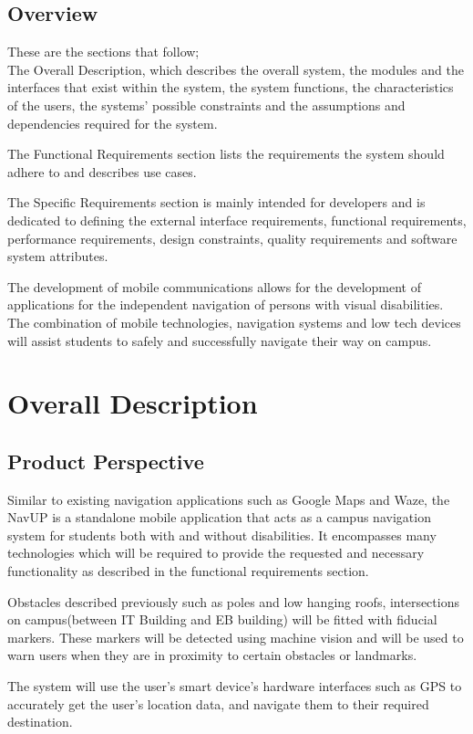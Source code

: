 \documentclass{article}
\begin{document}
	\subsection{Overview}
		These are the sections that follow; \\
		The Overall Description, which describes the overall system, the modules and the interfaces that exist within the system, the system functions, the characteristics of the users, the systems' possible constraints and the assumptions and dependencies required for the system.\par
		The Functional Requirements section lists the requirements the system should adhere to and describes use cases.\par
		The Specific Requirements section is mainly intended for developers and is dedicated to defining the external interface requirements, functional requirements, performance requirements, design constraints, quality requirements and software system attributes. \par
		The development of mobile communications allows for the development of applications for the independent navigation of persons with visual disabilities. The combination of mobile technologies, navigation systems and low tech devices will assist students to safely and successfully navigate their way on campus.	
		 

\newpage
\section{Overall Description}

	\subsection{Product Perspective}
		Similar to existing navigation applications such as Google Maps and Waze, the NavUP is a standalone mobile application that acts as a campus navigation system for students both with and without disabilities. It encompasses many technologies which will be required to provide the requested and necessary functionality as described in the functional requirements section.\\ \par
		Obstacles described previously such as poles and low hanging roofs, intersections on campus(between IT Building and EB building) will be fitted with fiducial markers. These markers will be detected using machine vision and will be used to warn users when they are in proximity to certain obstacles or landmarks.\par
		The system will use the user's smart device's hardware interfaces such as GPS to accurately get the user's location data, and navigate them to their required destination.\\
		
\end{document}
